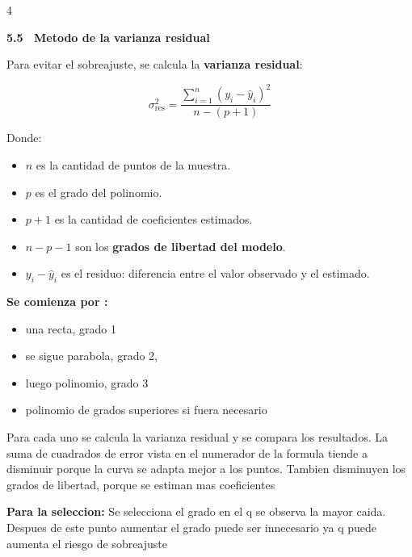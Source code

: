 \documentclass[10pt,a4paper,landscape]{article}
\newcommand{\tema}[1]{%
  \par\vspace{2pt}%
  \noindent\colorbox{black!16}{\parbox{\dimexpr\linewidth-2\fboxsep\relax}{%
    \fontsize{5.7}{6.6}\selectfont\bfseries #1\strut}}%
  \par\vspace{0.8pt}}
\newenvironment{lista}{\begin{itemize}[leftmargin=7pt,itemsep=0pt,topsep=0.5pt,parsep=0pt,labelsep=2pt]}{\end{itemize}}
\let\origsum\sum
\renewcommand{\sum}{\mathop{\textstyle\origsum}\limits}
\begin{document}
\begin{multicols}{4}
\tema{5.5 \ Metodo de la varianza residual}

Para evitar el sobreajuste, se calcula la \textbf{varianza residual}:

\begin{minipage}[t]{0.33\linewidth}
\vspace{1pt}
\[
\sigma_{\text{res}}^2 = \frac{\displaystyle\sum_{i=1}^{n} (y_i-\hat{y}_i)^2}{n-(p+1)}
\]
\end{minipage}\hfill
\begin{minipage}[t]{0.64\linewidth}
\vspace{0pt}
Donde:
\begin{lista}
  \item $n$ es la cantidad de puntos de la muestra.
  \item $p$ es el grado del polinomio.
  \item $p+1$ es la cantidad de coeficientes estimados.
  \item $n-p-1$ son los \textbf{grados de libertad del modelo}.
  \item $y_i - \hat{y}_i$ es el residuo: diferencia entre el valor observado y el estimado.
\end{lista}
\end{minipage}

\textbf{Se comienza por :}
\begin{lista}
  \item una recta, grado 1
  \item se sigue parabola, grado 2,
  \item luego polinomio, grado 3
  \item polinomio de grados superiores si fuera necesario
\end{lista}
Para cada uno se calcula la varianza residual y se compara los resultados. La suma de cuadrados de error vista en el numerador de la formula tiende a disminuir porque la curva se adapta mejor a los puntos. Tambien disminuyen los grados de libertad, porque se estiman mas coeficientes

\textbf{Para la seleccion:} Se selecciona el grado en el q se observa la mayor caida. Despues de este punto aumentar el grado puede ser innecesario ya q puede aumenta el riesgo de sobreajuste


\end{multicols}
\end{document}
